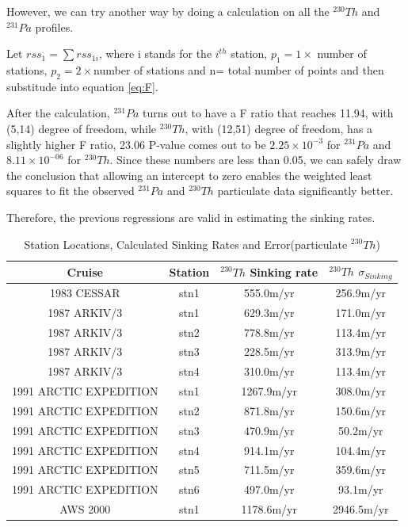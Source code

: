 \documentclass[paper=a4, fontsize=11pt]{scrartcl} %
\numberwithin{equation}{section} %
\numberwithin{figure}{section} %
\numberwithin{table}{section} %
\begin{document}
However, we can try another way by doing a calculation on all the $^{230}Th$ and $^{231}Pa$ profiles. 

Let $rss_{1}=\sum rss_{1i}$, where i stands for the $i^{th}$ station, $p_{1}=1\times$ number of stations, $p_{2}=2\times $number of stations and n= total number of points and then substitude into equation \ref{eq:F}.

After the calculation, $^{231}Pa$ turns out to have a F ratio that reaches 11.94, with (5,14) degree of freedom,  while $^{230}Th$, with (12,51) degree of freedom, has a slightly higher F ratio, 23.06 P-value comes out to be $2.25\times 10^{-3}$ for $^{231}Pa$ and $8.11\times10^{-06}$ for $^{230}Th$. Since these numbers are less than 0.05, we can safely draw the conclusion that allowing an intercept to zero enables the weighted least squares to fit the observed $^{231}Pa$ and $^{230}Th$ particulate data significantly better. 

Therefore, the previous regressions are valid in estimating the sinking rates. 

\begin{table}[!h]
\caption{Station Locations, Calculated Sinking Rates and Error(particulate $^{230}Th$)}%
\centering
\begin{tabular}{ |c|c|c|c|}
\hline
 Cruise &Station&$^{230}Th$ Sinking rate&$^{230}Th$ $\sigma_{Sinking}$\\
\hline
1983 CESSAR& stn1&555.0m/yr&256.9m/yr\\
1987 ARKIV/3&stn1&629.3m/yr&171.0m/yr\\
1987 ARKIV/3&stn2&778.8m/yr&113.4m/yr\\
1987 ARKIV/3&stn3&228.5m/yr&313.9m/yr\\
1987 ARKIV/3&stn4&310.0m/yr&113.4m/yr\\
1991 ARCTIC EXPEDITION&stn1&1267.9m/yr&308.0m/yr\\
1991 ARCTIC EXPEDITION&stn2&871.8m/yr&150.6m/yr\\
1991 ARCTIC EXPEDITION&stn3&470.9m/yr&50.2m/yr\\
1991 ARCTIC EXPEDITION&stn4&914.1m/yr&104.4m/yr\\
1991 ARCTIC EXPEDITION&stn5&711.5m/yr&359.6m/yr\\
1991 ARCTIC EXPEDITION&stn6&497.0m/yr&93.1m/yr\\
AWS 2000&stn1&1178.6m/yr&2946.5m/yr\\
\hline
\end{tabular}
\label{tab:sink_th}
\end{table}
\end{document}
